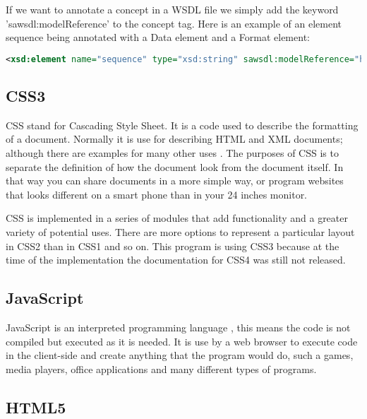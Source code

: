 \documentclass[a4paper,10pt]{article}
\begin{document}
  If we want to annotate a concept in a WSDL file we simply add the keyword 'sawsdl:modelReference' to the concept tag. Here is an example of an element sequence being annotated with a Data element and a Format element:

  \begin{lstlisting}[language=XML]  
    <xsd:element name="sequence" type="xsd:string" sawsdl:modelReference="http://edamontology.org/data_2043 http://edamontology.org/format_2200"/>
  \end{lstlisting}

  \subsection{CSS3}

    CSS stand for Cascading Style Sheet. It is a code used to describe the formatting of a document. Normally it is use for describing HTML and XML documents; although there are examples for many other uses \cite{css}. The purposes of CSS is to separate the definition of how the document look from the document itself. In that way you can share documents in a more simple way, or program websites that looks different on a smart phone than in your 24 inches monitor.\vspace{3 mm}

    CSS is implemented in a series of modules that add functionality and a greater variety of potential uses. There are more options to represent a particular layout in CSS2 than in CSS1 and so on. This program is using CSS3 because at the time of the implementation the documentation for CSS4 was still not released.

  \subsection{JavaScript}

  JavaScript is an interpreted programming language \cite{js} , this means the code is not compiled but executed as it is needed. It is use by a web browser to execute code in the client-side and create anything that the program would do, such a games, media players, office applications and many different types of programs.\vspace{3 mm}

  \subsection{HTML5}
\end{document}
